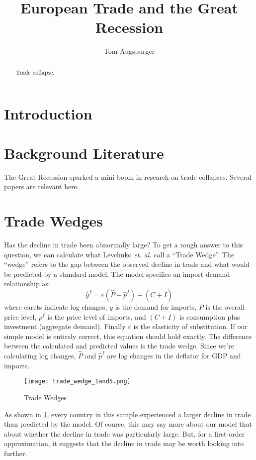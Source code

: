 \documentclass[11pt]{article}
\title{European Trade and the Great Recession}
\author{Tom Augspurger}
\date{}
\begin{document}
\maketitle
\begin{abstract}
    Trade collapse.
\end{abstract}
\section{Introduction}
\label{sec:introduction}

\section{Background Literature}
\label{sec:background_literature}
    The Great Recession sparked a mini boom in research on trade collapses.  Several papers are relevant here.
\section{Trade Wedges} %
\label{sec:trade_wedges}
    Has the decline in trade been abnormally large?  To get a rough answer to this question, we can calculate what Levchnko \emph{et. al.} \cite{llt:2010} call a ``Trade Wedge''.  The ``wedge'' refers to the gap between the observed decline in trade and what would be predicted by a standard model.  The model specifies an import demand relationship as:
    \begin{equation}
        \hat{y}^f = \varepsilon(\hat{P} - \hat{p}^f) + (\hat{C + I})
    \end{equation}
    where carets indicate log changes, $y$ is the demand for imports, $P$ is the overall price level, $p^f$ is the price level of imports, and $(C + I)$ is consumption plus investment (aggregate demand).  Finally $\varepsilon$ is the elasticity of substitution.  If our simple model is entirely correct, this equation should hold exactly.  The difference between the calculated and predicted values is the trade wedge.  Since we're calculating log changes, $\hat{P}$ and $\hat{p}^f$ are log changes in the deflator for GDP and imports.

    \begin{figure} \label{fig:trade_wedge}
      \centering
        \texttt{[image: trade\_wedge\_1and5.png]}
      \caption{Trade Wedges}
    \end{figure}

    As shown in \ref{fig:trade_wedge}, every country in this sample experienced a larger decline in trade than predicted by the model.  Of course, this may say more about our model that about whether the decline in trade was particularly large.  But, for a first-order approximation, it suggests that the decline in trade may be worth looking into further.
\end{document}
